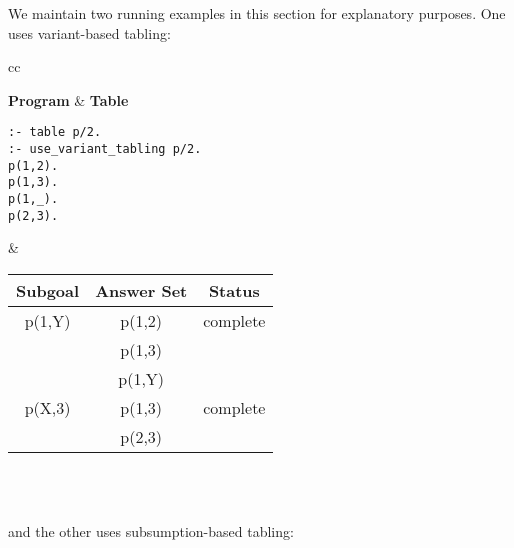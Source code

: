 We maintain two running examples in this section for explanatory
purposes.  One uses variant-based tabling:
%
\begin{center}
\begin{tabular}{cc}\hline \hline
{} \\ \hline \hline
\rule[-2ex]{0ex}{5ex} \textbf{Program} & \textbf{Table} \\
\begin{minipage}{14.5em}
\begin{verbatim}
:- table p/2.
:- use_variant_tabling p/2.
p(1,2).
p(1,3).
p(1,_).
p(2,3).
\end{verbatim}
\end{minipage}
&
\begin{tabular}{|c|c|c|} \hline
  Subgoal & Answer Set & Status\\ \hline \hline
  p(1,Y) & p(1,2) & complete \\ 
         & p(1,3) & \\
         & p(1,Y) & \\ \hline
  p(X,3) & p(1,3) & complete \\ 
         & p(2,3) & \\ \hline
\end{tabular} \\
\vspace*{-2ex} \\ \hline \hline
\end{tabular}
\end{center}

\noindent
and the other uses subsumption-based tabling:

